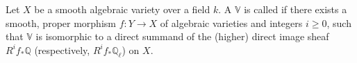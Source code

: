 \begin{definition} \label{definition:motivic_local_system_on_a_smooth_algebraic_variety}
Let $X$ be a smooth algebraic variety over a field $k$.
A  $\mathbb{V}$ is called  if there exists a smooth, proper morphism $f: Y \to X$ of algebraic varieties and integers $i \ge 0$, such that $\mathbb{V}$ is isomorphic to a direct summand of the (higher) direct image sheaf $R^i f_* \mathbb{Q}$ (respectively, $R^i f_* \mathbb{Q}_\ell$) on $X$.
\end{definition}